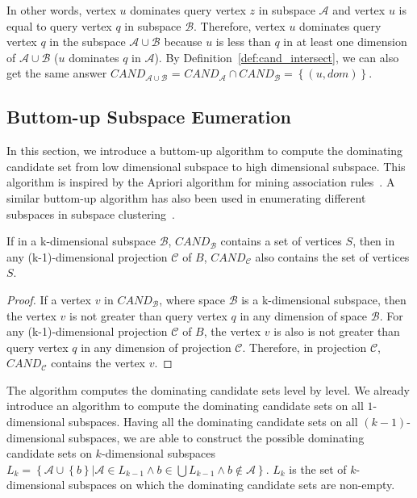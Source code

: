 In other words, vertex $u$ dominates query vertex $z$ in subspace $\mathcal{A}$ and vertex $u$ is equal to query vertex $q$ in subspace $\mathcal{B}$. 
Therefore, vertex $u$ dominates query vertex $q$ in the subspace $\mathcal{A} \cup \mathcal{B}$ because $u$ is less than $q$ in at least one dimension of $\mathcal{A} \cup \mathcal{B}$ ($u$ dominates $q$ in $\mathcal{A}$). By Definition~\ref{def:cand_intersect}, we can also get the same answer $\mathit{CAND}_{\mathcal{A} \cup \mathcal{B}}$ = $\mathit{CAND}_\mathcal{A} \cap \mathit{CAND}_\mathcal{B} = \left\{(u, dom)\right\}$.


\subsection{Buttom-up Subspace Eumeration}

In this section, we introduce a buttom-up algorithm to compute the dominating candidate set from low dimensional subspace to high dimensional subspace.
This algorithm is inspired by the Apriori algorithm for mining association rules~\cite{agrawal1996fast}. A similar buttom-up algorithm has also been used in enumerating different subspaces in subspace clustering~\cite{agrawal1998automatic}.

\begin{property}
If in a k-dimensional subspace $\mathcal{B}$, $\mathit{CAND}_\mathcal{B}$ contains a set of vertices $S$, then in any (k-1)-dimensional projection $\mathcal{C}$ of $B$, $\mathit{CAND}_\mathcal{C}$ also contains the set of vertices $S$.
\end{property}

\begin{proof}
If a vertex $v$ in $\mathit{CAND}_\mathcal{B}$, where space $\mathcal{B}$ is a k-dimensional subspace, then the vertex $v$ is not greater than query vertex $q$ in any dimension of space $\mathcal{B}$. For any (k-1)-dimensional projection $\mathcal{C}$ of $B$, the vertex $v$ is also is not greater than query vertex $q$ in any dimension of projection $\mathcal{C}$. Therefore, in projection $\mathcal{C}$, $\mathit{CAND}_\mathcal{C}$ contains the vertex $v$.
\end{proof}

The algorithm computes the dominating candidate sets level by level. We already introduce an algorithm to compute the dominating candidate sets on all $1$-dimensional subspaces. Having all the dominating candidate sets on all $(k-1)$-dimensional subspaces, we are able to construct the possible dominating candidate sets on $k$-dimensional subspaces $L_k = \left\{\mathcal{A} \cup \left\{b\right\} | \mathcal{A} \in L_{k-1} \wedge b \in \bigcup L_{k-1} \wedge b \notin \mathcal{A} \right\}$. $L_k$ is the set of $k$-dimensional subspaces on which the dominating candidate sets are non-empty.

